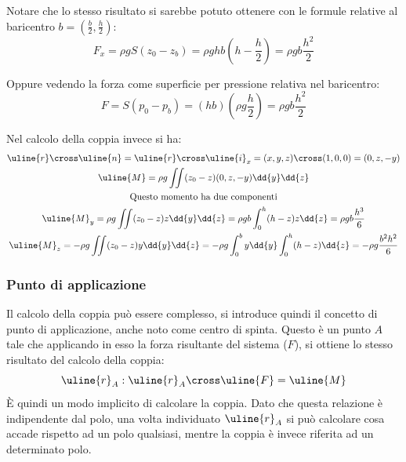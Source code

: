 Notare che lo stesso risultato si sarebbe potuto ottenere con le formule relative al baricentro $b = \left( \frac{b}{2} , \frac{h}{2} \right)$:
	\begin{equation*}
		F_x = \rho g S (z_0 - z_b) = \rho g h b \left( h - \frac{h}{2} \right) = \rho g b \frac{h^2}{2}
	\end{equation*}

Oppure vedendo la forza come superficie per pressione relativa nel baricentro:
	\begin{equation*}
		F = S (p_0 - p_b) = (h b) \left(\rho g \frac{h}{2} \right) =  \rho g b \frac{h^2}{2}
	\end{equation*}

Nel calcolo della coppia invece si ha:
	\begin{equation*}
		\begin{gathered}
			\uline{r} \cross \uline{n} = \uline{r} \cross \uline{i}_x = (x, y, z) \cross (1, 0, 0) = (0, z, -y) \\
			\uline{M} = \rho g \iint (z_0 - z) (0, z, -y) \dd{y} \dd{z} \\
			\text{Questo momento ha due componenti}\\
			\uline{M}_y = \rho g \iint (z_0 -z) z \dd{y} \dd{z} = \rho g b \int_0^h (h - z) z \dd{z}  = \rho g b \frac{h^3}{6}\\
			\uline{M}_z = - \rho g \iint (z_0 - z) y \dd{y} \dd{z} = - \rho g \int_0^b y \dd{y} \int_0^h (h - z) \dd{z} = - \rho g \frac{b^2 h^2}{6}
		\end{gathered}
	\end{equation*}
	
\subsubsection{Punto di applicazione}	
Il calcolo della coppia può essere complesso, si introduce quindi il concetto di punto di applicazione, anche noto come centro di spinta.
Questo è un punto $A$ tale che applicando in esso la forza risultante del sistema ($F$), si ottiene lo stesso risultato del calcolo della coppia:
	\begin{equation*}
		\uline{r}_A : \uline{r}_A \cross \uline{F} = \uline{M}
	\end{equation*}
È quindi un modo implicito di calcolare la coppia.
Dato che questa relazione è indipendente dal polo, una volta individuato $\uline{r}_A$ si può calcolare cosa accade rispetto ad un polo qualsiasi, mentre la coppia è invece riferita ad un determinato polo.

